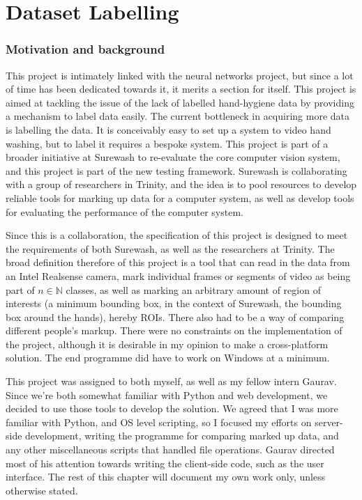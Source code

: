 \part{Dataset Labelling}
\section{Motivation and background}
This project is intimately linked with the neural networks project, but since a lot of time has been dedicated towards it, it merits a section for itself. This project is aimed at tackling the issue of the lack of labelled hand-hygiene data by providing a mechanism to label data easily. The current bottleneck in acquiring more data is labelling the data. It is conceivably easy to set up a system to video hand washing, but to label it requires a bespoke system. This project is part of a broader initiative at Surewash to re-evaluate the core computer vision system, and this project is part of the new testing framework. Surewash is collaborating with a group of researchers in Trinity, and the idea is to pool resources to develop reliable tools for marking up data for a computer system, as well as develop tools for evaluating the performance of the computer system.

Since this is a collaboration, the specification of this project is designed to meet the requirements of both Surewash, as well as the researchers at Trinity. The broad definition therefore of this project is a tool that can read in the data from an Intel Realsense camera, mark individual frames or segments of video as being part of $n \in \mathbb{N}$ classes, as well as marking an arbitrary amount of region of interests (a minimum bounding box, in the context of Surewash, the bounding box around the hands), hereby ROIs. There also had to be a way of comparing different people's markup. There were no constraints on the implementation of the project, although it is desirable in my opinion to make a cross-platform solution. The end programme did have to work on Windows at a minimum.

This project was assigned to both myself, as well as my fellow intern Gaurav. Since we're both somewhat familiar with Python and web development, we decided to use those tools to develop the solution. We agreed that I was more familiar with Python, and OS level scripting, so I focused my efforts on server-side development, writing the programme for comparing marked up data, and any other miscellaneous scripts that handled file operations. Gaurav directed most of his attention towards writing the client-side code, such as the user interface. The rest of this chapter will document my own work only, unless otherwise stated.

